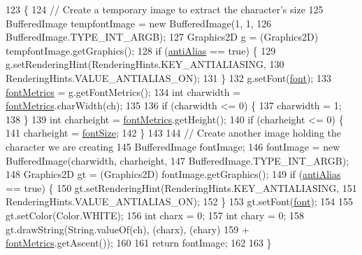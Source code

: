 \begin{DoxyCode}
123                                                 \{
124         \textcolor{comment}{// Create a temporary image to extract the character's size}
125         BufferedImage tempfontImage = \textcolor{keyword}{new} BufferedImage(1, 1,
126                 BufferedImage.TYPE\_INT\_ARGB);
127         Graphics2D g = (Graphics2D) tempfontImage.getGraphics();
128         \textcolor{keywordflow}{if} (\mbox{\hyperlink{classorg_1_1newdawn_1_1slick_1_1_true_type_font_a1dc8e98ba06633544ec9f69c434dc126}{antiAlias}} == \textcolor{keyword}{true}) \{
129             g.setRenderingHint(RenderingHints.KEY\_ANTIALIASING,
130                     RenderingHints.VALUE\_ANTIALIAS\_ON);
131         \}
132         g.setFont(\mbox{\hyperlink{classorg_1_1newdawn_1_1slick_1_1_true_type_font_a7c0b002b6010aa855bf4391ecf749498}{font}});
133         \mbox{\hyperlink{classorg_1_1newdawn_1_1slick_1_1_true_type_font_ad34436ad15502ef14d8e1a4092d7ab2f}{fontMetrics}} = g.getFontMetrics();
134         \textcolor{keywordtype}{int} charwidth = \mbox{\hyperlink{classorg_1_1newdawn_1_1slick_1_1_true_type_font_ad34436ad15502ef14d8e1a4092d7ab2f}{fontMetrics}}.charWidth(ch);
135 
136         \textcolor{keywordflow}{if} (charwidth <= 0) \{
137             charwidth = 1;
138         \}
139         \textcolor{keywordtype}{int} charheight = \mbox{\hyperlink{classorg_1_1newdawn_1_1slick_1_1_true_type_font_ad34436ad15502ef14d8e1a4092d7ab2f}{fontMetrics}}.getHeight();
140         \textcolor{keywordflow}{if} (charheight <= 0) \{
141             charheight = \mbox{\hyperlink{classorg_1_1newdawn_1_1slick_1_1_true_type_font_ac16e29cb90eac37712d06dc36aaced56}{fontSize}};
142         \}
143 
144         \textcolor{comment}{// Create another image holding the character we are creating}
145         BufferedImage fontImage;
146         fontImage = \textcolor{keyword}{new} BufferedImage(charwidth, charheight,
147                 BufferedImage.TYPE\_INT\_ARGB);
148         Graphics2D gt = (Graphics2D) fontImage.getGraphics();
149         \textcolor{keywordflow}{if} (\mbox{\hyperlink{classorg_1_1newdawn_1_1slick_1_1_true_type_font_a1dc8e98ba06633544ec9f69c434dc126}{antiAlias}} == \textcolor{keyword}{true}) \{
150             gt.setRenderingHint(RenderingHints.KEY\_ANTIALIASING,
151                     RenderingHints.VALUE\_ANTIALIAS\_ON);
152         \}
153         gt.setFont(\mbox{\hyperlink{classorg_1_1newdawn_1_1slick_1_1_true_type_font_a7c0b002b6010aa855bf4391ecf749498}{font}});
154 
155         gt.setColor(Color.WHITE);
156         \textcolor{keywordtype}{int} charx = 0;
157         \textcolor{keywordtype}{int} chary = 0;
158         gt.drawString(String.valueOf(ch), (charx), (chary)
159                 + \mbox{\hyperlink{classorg_1_1newdawn_1_1slick_1_1_true_type_font_ad34436ad15502ef14d8e1a4092d7ab2f}{fontMetrics}}.getAscent());
160 
161         \textcolor{keywordflow}{return} fontImage;
162 
163     \}
\end{DoxyCode}
